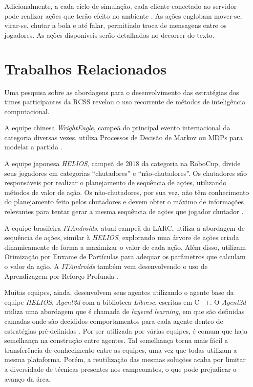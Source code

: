 Adicionalmente, a cada ciclo de simulação, cada cliente conectado ao servidor pode realizar ações que terão efeito no ambiente \cite{rcssmanual2003}. As ações englobam mover-se, virar-se, chutar a bola e até falar, permitindo troca de mensagens entre os jogadores. As ações disponíveis serão detalhadas no decorrer do texto.


\section{Trabalhos Relacionados}
\label{subsec:abordagens}

Uma pesquisa sobre as abordagens para o desenvolvimento das estratégias dos times participantes da RCSS revelou o uso recorrente de métodos de inteligência computacional.

A equipe chinesa \textit{WrightEagle}, campeã do principal evento internacional da categoria diversas vezes, utiliza Processos de Decisão de Markov ou MDPs para modelar a partida \cite{bai2015online}.

A equipe japonesa \textit{HELIOS}, campeã de 2018 da categoria na RoboCup, divide seus jogadores em categorias ``chutadores'' e ``não-chutadores''.
Os chutadores são responsáveis por realizar o planejamento de sequência de ações, utilizando métodos de valor de ação.
Os não-chutadores, por sua vez, não têm conhecimento do planejamento feito pelos chutadores e devem obter o máximo de informações relevantes para tentar gerar a mesma sequência de ações que jogador chutador \cite{nakashima2018helios2018}.

A equipe brasileira \textit{ITAndroids}, atual campeã da LARC, utiliza a abordagem de sequência de ações, similar à \textit{HELIOS}, explorando uma árvore de ações criada dinamicamente de forma a maximizar o valor de cada ação. Além disso, utilizam Otimização por Enxame de Partículas \cite{melloitandroids} para adequar os parâmetros que calculam o valor da ação. A \textit{ITAndroids} também vem desenvolvendo o uso de Aprendizagem por Reforço Profunda \cite{maximoitandroids}.

Muitas equipes, ainda, desenvolvem seus agentes utilizando o agente base da equipe \textit{HELIOS}, \textit{Agent2d} com a biblioteca \textit{Librcsc}, escritas em C++. O \textit{Agent2d} utiliza uma abordagem que é chamada de \textit{layered learning}, em que são definidas camadas onde são decididos comportamentos para cada agente dentro de estratégias pré-definidas \cite{nakashima2018helios2018}. Por ser utilizada por várias equipes, é comum que haja semelhança na construção entre agentes. Tal semelhança torna mais fácil a transferência de conhecimento entre as equipes, uma vez que todas utilizam a mesma plataforma. Porém, a reutilização das mesmas soluções acaba por limitar a diversidade de técnicas presentes nos campeonatos, o que pode prejudicar o avanço da área.

